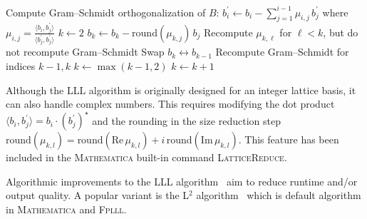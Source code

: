 \documentclass[a4paper,11pt]{article}
\begin{document}
\begin{algorithm}[!htbp]
  \caption{LLL algorithm}\label{alg:lll}
  \begin{algorithmic}[1]
      \State  Compute Gram–Schmidt orthogonalization of $B$: 
          \State $\displaystyle b_i^\prime \gets b_i - \sum_{j=1}^{i-1} \mu_{i,j}\, b_j^\prime$
          \State where $\displaystyle \mu_{i,j} = \frac{\langle b_i, b_j^\prime\rangle}{\langle  b_j^\prime,b_j^\prime\rangle}$
        \EndFor
      \State $k \gets 2$
            \State $b_k \gets b_k - \mathrm{round}(\mu_{k,j})\,b_j$
            \State Recompute $\mu_{k,\ell}$ for $\ell<k$, but do not recompute Gram–Schmidt
          \EndIf
        \EndFor
          \State Swap $b_k \leftrightarrow b_{k-1}$
          \State Recompute Gram–Schmidt for indices $k-1,k$
          \State $k \gets \max(k-1,2)$
        \Else
          \State $k \gets k + 1$
        \EndIf
      \EndWhile
      \State {}
    \EndProcedure
  \end{algorithmic}
\end{algorithm}

Although the LLL algorithm is originally designed for an integer lattice basis, it can also handle complex numbers. This requires modifying the dot product $\langle b_i, b_j^\prime\rangle= b_i \cdot (b_j^\prime)^\star$ and the rounding in the size reduction step $\text{round}(\mu_{k,l})=\text{round}(\text{Re}\,\mu_{k,l})+ i \, \text{round}(\text{Im}\,\mu_{k,l})$. This feature has been included in the \textsc{Mathematica} built-in command \textsc{LatticeReduce}. 


Algorithmic improvements to the LLL algorithm~\cite{ Kaltofen:1983,  Schnorr:1988, Gama:2006, Nguyen:2009,Dabral:2024} aim to reduce  runtime and/or output quality. A popular variant  is the L${}^2$ algorithm~\cite{Nguyen:2009} which is default algorithm in \textsc{Mathematica} and \textsc{Fplll}.
\end{document}
